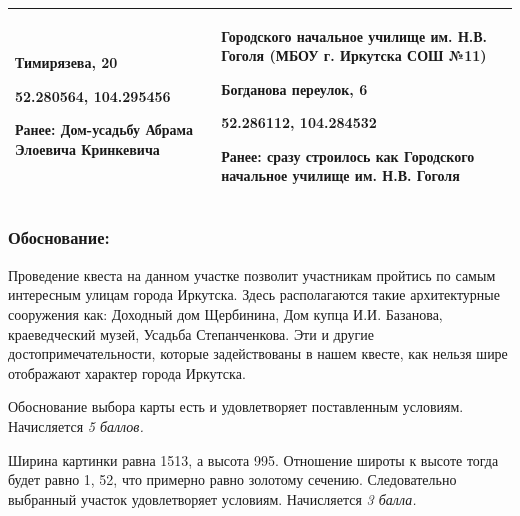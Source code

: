 \begin{supertabular}[c]{@{}|p{8cm}|p{8cm}|@{}}
    Тимирязева, 20
    
    52.280564, 104.295456 

    Ранее: Дом-усадьбу Абрама Элоевича Кринкевича & Городского начальное училище им. Н.В. Гоголя (МБОУ г. Иркутска СОШ №11)
    
    Богданова переулок, 6 

    52.286112, 104.284532
    
    Ранее: сразу строилось как Городского начальное училище им. Н.В. Гоголя \\
    \hline    
\end{supertabular}

\subsubsection*{Обоснование:}

Проведение квеста на данном участке позволит участникам пройтись по самым интересным улицам города Иркутска. Здесь располагаются такие архитектурные сооружения как:  Доходный дом Щербинина, Дом купца И.И. Базанова, краеведческий музей, Усадьба Степанченкова. Эти и другие достопримечательности, которые задействованы в нашем квесте, как нельзя шире отображают характер города Иркутска. 


\markSection

Обоснование выбора карты есть и удовлетворяет поставленным условиям. Начисляется \textit{5 баллов.}

Ширина картинки равна 1513, а высота 995. Отношение широты к высоте тогда будет равно 1, 52, что примерно равно золотому сечению. Следовательно выбранный участок удовлетворяет условиям. Начисляется \textit{3 балла.}